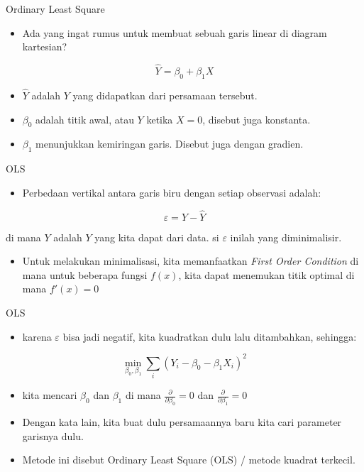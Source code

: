 \documentclass[
  ignorenonframetext,
]{beamer}
\providecommand{\tightlist}{%
  \setlength{\itemsep}{0pt}\setlength{\parskip}{0pt}}\usepackage{longtable,booktabs,array}
\begin{document}
\begin{frame}{Ordinary Least Square}
\label{ordinary-least-square}
\begin{itemize}
\tightlist
\item
  Ada yang ingat rumus untuk membuat sebuah garis linear di diagram
  kartesian?
\end{itemize}

\[
\hat{Y}=\beta_0+\beta_1 X
\]

\begin{itemize}
\item
  \(\hat{Y}\) adalah \(Y\) yang didapatkan dari persamaan tersebut.
\item
  \(\beta_0\) adalah titik awal, atau \(Y\) ketika \(X=0\), disebut juga
  konstanta.
\item
  \(\beta_1\) menunjukkan kemiringan garis. Disebut juga dengan gradien.
\end{itemize}
\end{frame}

\begin{frame}{OLS}
\label{ols}
\begin{itemize}
\tightlist
\item
  Perbedaan vertikal antara garis biru dengan setiap observasi adalah:
\end{itemize}

\[
\varepsilon=Y-\hat{Y}
\]

di mana \(Y\) adalah \(Y\) yang kita dapat dari data. si \(\varepsilon\)
inilah yang diminimalisir.

\begin{itemize}
\tightlist
\item
  Untuk melakukan minimalisasi, kita memanfaatkan \emph{First Order
  Condition} di mana untuk beberapa fungsi \(f(x)\), kita dapat
  menemukan titik optimal di mana \(f'(x)=0\)
\end{itemize}
\end{frame}

\begin{frame}{OLS}
\label{ols-1}
\begin{itemize}
\tightlist
\item
  karena \(\varepsilon\) bisa jadi negatif, kita kuadratkan dulu lalu
  ditambahkan, sehingga:
\end{itemize}

\[
\min_{\beta_0,\beta_1} \sum_i \left(Y_i-\beta_0-\beta_1 X_i \right)^2
\]

\begin{itemize}
\item
  kita mencari \(\beta_0\) dan \(\beta_1\) di mana
  \(\frac{\partial}{\partial \beta_0}=0\) dan
  \(\frac{\partial}{\partial \beta_1}=0\)
\item
  Dengan kata lain, kita buat dulu persamaannya baru kita cari parameter
  garisnya dulu.
\item
  Metode ini disebut Ordinary Least Square (OLS) / metode kuadrat
  terkecil.
\end{itemize}
\end{frame}
\end{document}
